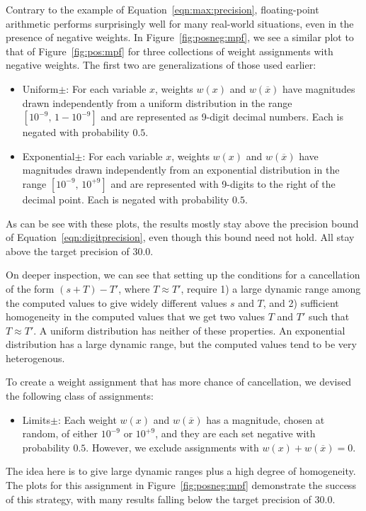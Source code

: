 \documentclass[letterpaper,USenglish,cleveref, autoref, thm-restate]{lipics-v2021}
\newcommand{\obar}[1]{\overline{#1}}
\begin{document}
Contrary to the example of
Equation~\ref{eqn:max:precision},
floating-point arithmetic performs surprisingly well for
many real-world
situations, even in the presence of negative weights.
In Figure~\ref{fig:posneg:mpf}, we see a similar plot to that of Figure~\ref{fig:pos:mpf} for
three collections of weight assignments with negative weights.  The first two are generalizations of those used earlier:
\begin{itemize}
\item \textsf{Uniform$\pm$}: For each variable $x$, weights $w(x)$ and $w(\obar{x})$ have magnitudes drawn independently
from a uniform distribution in the range  $[10^{-9},\,1-10^{-9}]$ and are represented as 9-digit decimal numbers.  Each is negated with probability $0.5$.
\item \textsf{Exponential$\pm$}: For each variable $x$, weights $w(x)$ and $w(\obar{x})$ have magnitudes
  drawn independently from an exponential distribution in the range $[10^{-9},\,10^{+9}]$ and are represented with 9-digits to the right of the decimal point.  Each is negated with probability $0.5$.
\end{itemize}
As can be see with these plots, the results mostly stay above the precision bound of Equation~\ref{eqn:digitprecision},
even though this bound need not hold.  All stay above the target precision of $30.0$.

On deeper inspection, we can see that setting up the conditions for a
cancellation of the form $(s + T) - T'$, where $T \approx T'$, require
1) a large dynamic range among the computed values to give widely different values $s$ and $T$, and 2) sufficient
homogeneity in the computed values that we get two values $T$ and
$T'$ such that $T \approx T'$.  A uniform distribution has neither of
these properties.  An exponential distribution has a large dynamic
range, but the computed values tend to be very heterogenous.

To create a weight assignment that has more chance of cancellation, we devised the following class of assignments:
\begin{itemize}
\item\textsf{Limits$\pm$}:  Each weight $w(x)$ and $w(\obar{x})$ has a magnitude, chosen at random, of either $10^{-9}$ or $10^{+9}$, and they are each set negative with probability $0.5$.
  However, we exclude assignments with $w(x) + w(\obar{x}) = 0$.
\end{itemize}
The idea here is to give large dynamic ranges plus a high degree of
homogeneity.  The plots for this assignment in
Figure~\ref{fig:posneg:mpf} demonstrate the success of this strategy,
with many results falling below the target precision of $30.0$.
\end{document}
